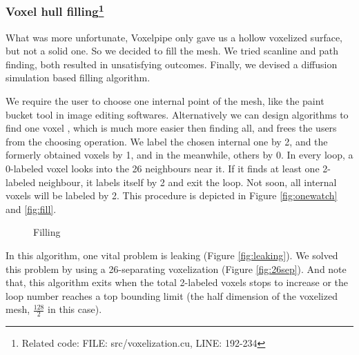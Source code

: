 \documentclass[a4paper]{article}
\begin{document}
\begin{CJK*}{UTF8}{gkai}
\subsubsection[Voxel hull filling]{Voxel hull filling\footnote{Related code: FILE: src/voxelization.cu, LINE: 192-234}}
What was more unfortunate, Voxelpipe only gave us a hollow voxelized surface, but not a solid one. So we decided to fill the mesh. We tried scanline and path finding, both resulted in unsatisfying outcomes. Finally, we devised a diffusion simulation based filling algorithm. 

We require the user to choose one internal point of the mesh, like the paint bucket tool in image editing softwares. Alternatively we can design algorithms to find one voxel , which is much more easier then finding all, and frees the users from the choosing operation. We label the chosen internal one by 2, and the formerly obtained voxels by 1, and in the meanwhile, others by 0. In every loop, a 0-labeled voxel looks into the 26 neighbours near it. If it finds at least one 2-labeled neighbour, it labels itself by 2 and exit the loop. Not soon, all internal voxels will be labeled by 2. This procedure is depicted in Figure \ref{fig:onewatch} and \ref{fig:fill}.

\begin{figure}[H]
\centering
{}
\hspace{0in}
\caption{Filling}
\label{fig:subfig} 
\end{figure}


In this algorithm, one vital problem is leaking (Figure \ref{fig:leaking}). We solved this problem by using a 26-separating voxelization (Figure \ref{fig:26sep}). And note that, this algorithm exits when the total 2-labeled voxels stops to increase or the loop number reaches a top bounding limit (the half dimension of the voxelized mesh, $\frac{128}{2}$ in this case).



\end{CJK*}
\end{document}

